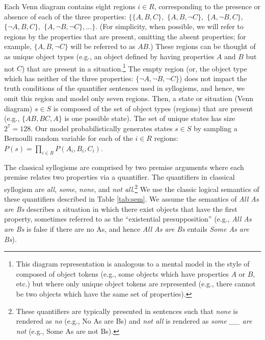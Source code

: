 \documentclass[floatsintext, doc]{apa6}
\newcommand{\mht}[1]{{\textcolor{Blue}{[mht: #1]}}}
\begin{document}
Each Venn diagram contains eight regions $i \in R$, corresponding to the presence or absence of each of the three properties: $\{\{A,B,C\},$ $\{A,B,\neg C\},$ $\{A,\neg B,C\},$ $\{\neg A, B, C\},$ $\{A, \neg B, \neg C\},...\}$. (For simplicity, when possible, we will refer to regions by the properties that are present, omitting the absent properties; for example, $\{A, B, \neg C\}$ will be referred to as $AB$.)
These regions can be thought of as unique object types (e.g., an object defined by having properties $A$ and $B$ but not $C$) that are present in a situation.\footnote{This diagram representation is analogous to a mental model in the style of  composed of object tokens (e.g., some objects which have properties $A$ or $B$, etc.) but where only unique object tokens are represented (e.g., there cannot be two objects which have the same set of properties).}
The empty region (or, the object type which has neither of the three properties: $\{\neg A, \neg B, \neg C\}$) does not impact the truth conditions of the quantifier sentences used in syllogisms, and hence, we omit this region and model only seven regions.
Then, a state or situation (Venn diagram) $s \in S$ is composed of the set of object types (regions) that are present (e.g., $\{AB, BC, A\}$ is one possible state).
The set of unique states has size $2^7 = 128$.
Our model probabilistically generates states $s \in S$ by sampling a Bernoulli random variable for each of the $i \in R$ regions: $P(s) = \prod_{i \in R} P(A_{i}, B_{i}, C_{i})$. %

The classical syllogisms are comprised by two premise arguments where each premise relates two properties via a quantifier. 
The quantifiers in classical syllogism are \emph{all}, \emph{some}, \emph{none}, and \emph{not all}.\footnote{
These quantifiers are typically presented in sentences such that \emph{none} is rendered as \emph{no} (e.g., No As are Bs) and \emph{not all} is rendered as \emph{some \_\_ are not} (e.g., Some As are not Bs).
}
We use the classic logical semantics of these quantifiers described in Table \ref{tab:sem}.
We assume the semantics of \emph{All As are Bs} describes a situation in which there exist objects that have the first property, sometimes referred to as the ``existential presupposition'' (e.g., \emph{All As are Bs} is false if there are no As, and hence \emph{All As are Bs} entails \emph{Some As are Bs}). 
\end{document}
